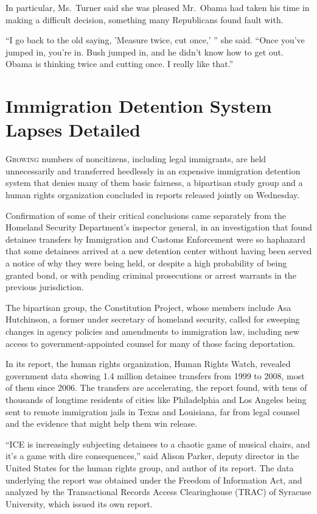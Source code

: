 ﻿\documentclass[12pt]{article}
\begin{document}
In particular, Ms.~Turner said she was pleased Mr.~Obama had taken his time in making a difficult
decision, something many Republicans found fault with.

``I go back to the old saying, 'Measure twice, cut once,' '' she said. ``Once you've jumped in,
you're in. Bush jumped in, and he didn't know how to get out. Obama is thinking twice and cutting
once. I really like that.''

\section{Immigration Detention System Lapses Detailed}

\lettrine{G}{rowing} numbers of noncitizens, including legal immigrants, are
held unnecessarily and transferred heedlessly in an expensive immigration detention system that
denies many of them basic fairness, a bipartisan study group and a human rights organization
concluded in reports released jointly on Wednesday.

Confirmation of some of their critical conclusions came separately from the Homeland Security
Department's inspector general, in an investigation that found detainee transfers by Immigration and
Customs Enforcement were so haphazard that some detainees arrived at a new detention center without
having been served a notice of why they were being held, or despite a high probability of being
granted bond, or with pending criminal prosecutions or arrest warrants in the previous jurisdiction.

The bipartisan group, the Constitution Project, whose members include Asa Hutchinson, a former under
secretary of homeland security, called for sweeping changes in agency policies and amendments to
immigration law, including new access to government-appointed counsel for many of those facing
deportation.

In its report, the human rights organization, Human Rights Watch, revealed government data showing
1.4 million detainee transfers from 1999 to 2008, most of them since 2006. The transfers are
accelerating, the report found, with tens of thousands of longtime residents of cities like
Philadelphia and Los Angeles being sent to remote immigration jails in Texas and Louisiana, far from
legal counsel and the evidence that might help them win release.

``ICE is increasingly subjecting detainees to a chaotic game of musical chairs, and it's a game with
dire consequences,'' said Alison Parker, deputy director in the United States for the human rights
group, and author of its report. The data underlying the report was obtained under the Freedom of
Information Act, and analyzed by the Transactional Records Access Clearinghouse (TRAC) of Syracuse
University, which issued its own report.
\end{document}
